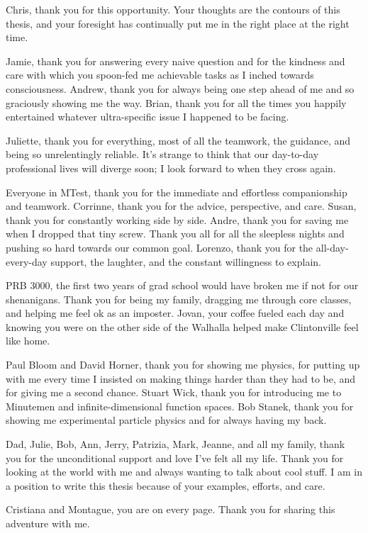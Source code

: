 \begin{acknowledgements}

Chris, thank you for this opportunity. Your thoughts are the contours of this thesis, and your foresight has continually put me in the right place at the right time.

Jamie, thank you for answering every naive question and for the kindness and care with which you spoon-fed me achievable tasks as I inched towards consciousness. Andrew, thank you for always being one step ahead of me and so graciously showing me the way. Brian, thank you for all the times you happily entertained whatever ultra-specific issue I happened to be facing.

Juliette, thank you for everything, most of all the teamwork, the guidance, and being so unrelentingly reliable. It's strange to think that our day-to-day professional lives will diverge soon; I look forward to when they cross again.

Everyone in MTest, thank you for the immediate and effortless companionship and teamwork. Corrinne, thank you for the advice, perspective, and care. Susan, thank you for constantly working side by side. Andre, thank you for saving me when I dropped that tiny screw. Thank you all for all the sleepless nights and pushing so hard towards our common goal. Lorenzo, thank you for the all-day-every-day support, the laughter, and the constant willingness to explain.

PRB 3000, the first two years of grad school would have broken me if not for our shenanigans. Thank you for being my family, dragging me through core classes, and helping me feel ok as an imposter. Jovan, your coffee fueled each day and knowing you were on the other side of the Walhalla helped make Clintonville feel like home.

Paul Bloom and David Horner, thank you for showing me physics, for putting up with me every time I insisted on making things harder than they had to be, and for giving me a second chance. Stuart Wick, thank you for introducing me to Minutemen and infinite-dimensional function spaces. Bob Stanek, thank you for showing me experimental particle physics and for always having my back.

Dad, Julie, Bob, Ann, Jerry, Patrizia, Mark, Jeanne, and all my family, thank you for the unconditional support and love I've felt all my life. Thank you for looking at the world with me and always wanting to talk about cool stuff. I am in a position to write this thesis because of your examples, efforts, and care.

Cristiana and Montague, you are on every page. Thank you for sharing this adventure with me.

\end{acknowledgements}